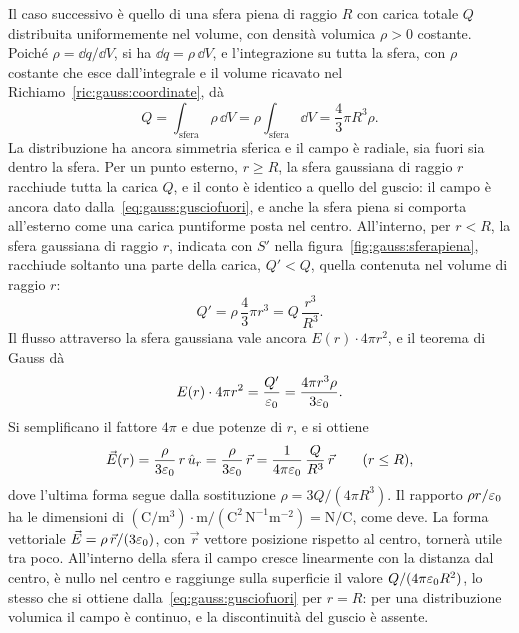 \documentclass[11pt,a4paper]{article}
\begin{document}
Il caso successivo è quello di una sfera piena di raggio $R$ con carica totale $Q$ distribuita uniformemente nel volume, con densità volumica $\rho>0$ costante. Poiché $\rho=\dd q/\dd V$, si ha $\dd q=\rho\,\dd V$, e l'integrazione su tutta la sfera, con $\rho$ costante che esce dall'integrale e il volume ricavato nel Richiamo~\ref{ric:gauss:coordinate}, dà
\[
Q=\int_{\mathrm{sfera}}\rho\,\dd V=\rho\int_{\mathrm{sfera}}\dd V=\frac{4}{3}\pi R^3\rho .
\]
La distribuzione ha ancora simmetria sferica e il campo è radiale, sia fuori sia dentro la sfera. Per un punto esterno, $r\ge R$, la sfera gaussiana di raggio $r$ racchiude tutta la carica $Q$, e il conto è identico a quello del guscio: il campo è ancora dato dalla~\eqref{eq:gauss:gusciofuori}, e anche la sfera piena si comporta all'esterno come una carica puntiforme posta nel centro. All'interno, per $r<R$, la sfera gaussiana di raggio $r$, indicata con $S'$ nella figura~\ref{fig:gauss:sferapiena}, racchiude soltanto una parte della carica, $Q'<Q$, quella contenuta nel volume di raggio $r$:
\[
Q'=\rho\,\frac{4}{3}\pi r^3=Q\,\frac{r^3}{R^3}.
\]
Il flusso attraverso la sfera gaussiana vale ancora $E(r)\cdot4\pi r^2$, e il teorema di Gauss dà
\[
E(r)\cdot4\pi r^2=\frac{Q'}{\varepsilon_0}=\frac{4\pi r^3\rho}{3\varepsilon_0} .
\]
Si semplificano il fattore $4\pi$ e due potenze di $r$, e si ottiene
\begin{equation}
\vec{E}(r)=\frac{\rho}{3\varepsilon_0}\,r\,\hat{u}_r=\frac{\rho}{3\varepsilon_0}\,\vec{r}=\frac{1}{4\pi\varepsilon_0}\,\frac{Q}{R^3}\,\vec{r}\qquad(r\le R),
\label{eq:gauss:sferapiena}
\end{equation}
dove l'ultima forma segue dalla sostituzione $\rho=3Q/(4\pi R^3)$. Il rapporto $\rho r/\varepsilon_0$ ha le dimensioni di $(\mathrm{C/m^3})\cdot\mathrm{m}/(\mathrm{C^2\,N^{-1}m^{-2}})=\mathrm{N/C}$, come deve. La forma vettoriale $\vec{E}=\rho\,\vec{r}/(3\varepsilon_0)$, con $\vec{r}$ vettore posizione rispetto al centro, tornerà utile tra poco. All'interno della sfera il campo cresce linearmente con la distanza dal centro, è nullo nel centro e raggiunge sulla superficie il valore $Q/(4\pi\varepsilon_0 R^2)$, lo stesso che si ottiene dalla~\eqref{eq:gauss:gusciofuori} per $r=R$: per una distribuzione volumica il campo è continuo, e la discontinuità del guscio è assente.
\end{document}
